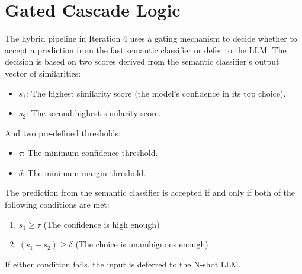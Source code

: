 \section{Gated Cascade Logic}

The hybrid pipeline in Iteration 4 uses a gating mechanism to decide whether to accept a prediction from the fast semantic classifier or defer to the LLM. The decision is based on two scores derived from the semantic classifier's output vector of similarities:
\begin{itemize}
    \item $s_1$: The highest similarity score (the model's confidence in its top choice).
    \item $s_2$: The second-highest similarity score.
\end{itemize}
And two pre-defined thresholds:
\begin{itemize}
    \item $\tau$: The minimum confidence threshold.
    \item $\delta$: The minimum margin threshold.
\end{itemize}
The prediction from the semantic classifier is accepted if and only if both of the following conditions are met:
\begin{enumerate}
    \item $s_1 \ge \tau$ (The confidence is high enough)
    \item $(s_1 - s_2) \ge \delta$ (The choice is unambiguous enough)
\end{enumerate}
If either condition fails, the input is deferred to the N-shot LLM.